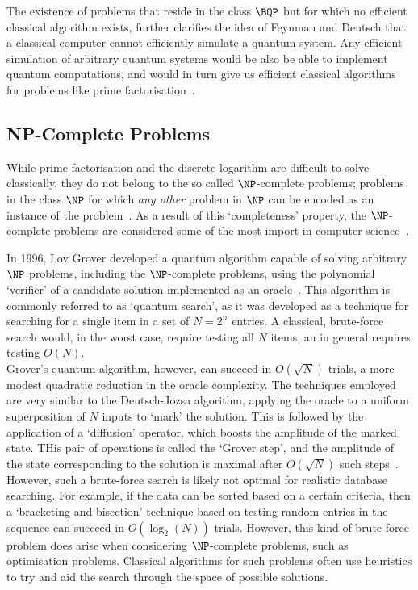 \documentclass{standalone}
\begin{document}
\par
The existence of problems that reside in the class $\BQP$ but for which no efficient classical algorithm exists, further clarifies the idea of Feynman and Deutsch that a classical computer cannot efficiently simulate a quantum system. Any efficient simulation of arbitrary quantum systems would be also be able to implement quantum computations, and would in turn give us efficient classical algorithms for problems like prime factorisation~\cite{Shor1997}.

\subsection{NP-Complete Problems}\label{sec:notNP}
While prime factorisation and the discrete logarithm are difficult to solve classically, they do not belong to the so called $\NP$-complete problems; problems in the class $\NP$ for which \emph{any other} problem in $\NP$ can be encoded as an instance of the problem~\cite{ComplexityZoo}. As a result of this `completeness' property, the $\NP$-complete problems are considered some of the most import in computer science~\cite{Bennett1997}.
\par
In 1996, Lov Grover developed a quantum algorithm capable of solving arbitrary $\NP$ problems, including the $\NP$-complete problems, using the polynomial `verifier' of a candidate solution implemented as an oracle~\cite{Grover1996}. This algorithm is commonly referred to as `quantum search', as it was developed as a technique for searching for a single item in a set of $N=2^{n}$ entries. A classical, brute-force search would, in the worst case, require testing all $N$ items, an in general requires testing $O(N)$. \\
Grover's quantum algorithm, however, can succeed in $O(\sqrt{N})$ trials, a more modest quadratic reduction in the oracle complexity. The techniques employed are very similar to the Deutsch-Jozsa algorithm, applying the oracle to a uniform superposition of $N$ inputs to `mark' the solution. This is followed by the application of a `diffusion' operator, which boosts the amplitude of the marked state. THis pair of operations is called the `Grover step', and the amplitude of the state corresponding to the solution is maximal after $O(\sqrt{N})$ such steps~\cite{Grover1996}.\\
However, such a brute-force search is likely not optimal for realistic database searching. For example, if the data can be sorted based on a certain criteria, then a `bracketing and bisection' technique based on testing random entries in the sequence can succeed in $O(\log_{2}(N))$ trials. However, this kind of brute force problem does arise when considering $\NP$-complete problems, such as optimisation problems. Classical algorithms for such problems often use heuristics to try and aid the search through the space of possible solutions.\\
\end{document}
